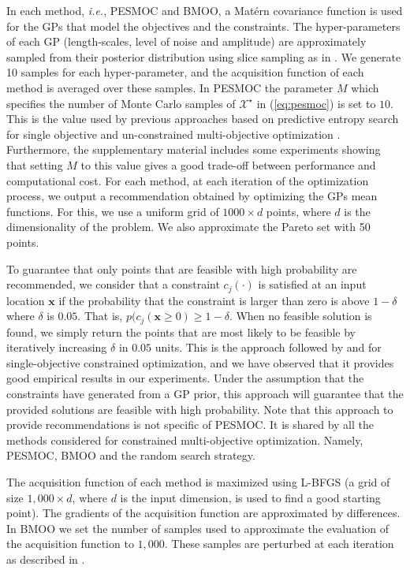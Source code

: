 \documentclass[review,preprint,12pt]{elsarticle}
\begin{document}
In each method, \emph{i.e.}, PESMOC and BMOO, a Mat\'ern covariance function is used for the GPs that model the 
objectives and the constraints. The hyper-parameters of each GP (length-scales, level of noise and amplitude) are 
approximately sampled from their posterior distribution using slice sampling as in \citep{snoek2012practical}. 
We generate 10 samples for each hyper-parameter, and the acquisition function of each method is averaged over these samples. 
In PESMOC the parameter $M$ which specifies the number of Monte Carlo samples of $\mathcal{X}^\star$ in (\ref{eq:pesmoc}) 
is set to $10$.  This is the value used by previous approaches based on predictive entropy search for single objective and 
un-constrained multi-objective optimization \citep{hernandez2016general,hernandez2016predictive}.
Furthermore, the supplementary material includes some experiments showing that setting $M$ to this value gives a good 
trade-off between performance and computational cost. For each method, at each iteration of the optimization process, we output a recommendation 
obtained by optimizing the GPs mean functions. For this, we use a uniform grid of $1000\times d$ points, where $d$ is 
the dimensionality of the problem. We also approximate the Pareto set with 50 points.

To guarantee that only points that are feasible with high probability are recommended, we consider that a constraint 
$c_j(\cdot)$ is satisfied at an input location $\mathbf{x}$ if the probability that the constraint is larger than zero is 
above $1-\delta$ where $\delta$ is $0.05$. That is, $p(c_j(\mathbf{x}\geq 0) \geq 1 - \delta$. 
When no feasible solution is found, we simply return the points that are most likely to 
be feasible by iteratively increasing $\delta$ in $0.05$ units. This is the approach followed by 
\cite{gelbart2014bayesian} and \cite{hernandez2016general} for single-objective constrained
optimization, and we have observed that it provides good empirical results in our experiments.
Under the assumption that the constraints have generated from a GP prior, this approach will 
guarantee that the provided solutions are feasible with high probability. Note that this approach to provide recommendations 
is not specific of PESMOC. It is shared by all the methods considered for constrained multi-objective optimization. Namely, 
PESMOC, BMOO and the random search strategy.

The acquisition function of each method is maximized using L-BFGS (a grid of size $1,000 \times d$, where $d$ is the 
input dimension, is used to find a good starting point). The gradients of the acquisition function are 
approximated by differences. In BMOO we set the number of samples used to approximate the evaluation of 
the acquisition function to $1,000$. These samples are perturbed at each iteration as described in \citep{feliot2015bayesian}.
\end{document}
